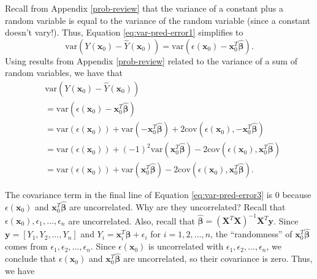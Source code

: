 \documentclass[
]{book}
\theoremstyle{definition}
\theoremstyle{definition}
\theoremstyle{definition}
\theoremstyle{definition}
\theoremstyle{remark}
\begin{document}
Recall from Appendix \ref{prob-review} that the variance of a constant plus a random variable is equal to the variance of the random variable (since a constant doesn't vary!). Thus, Equation \eqref{eq:var-pred-error1} simplifies to
\[
\mathrm{var}\left(Y(\mathbf{x}_0)-\hat{Y}(\mathbf{x}_0)\right) = \mathrm{var}(\epsilon(\mathbf{x}_0)-\mathbf{x}_0^T \hat{\boldsymbol{\beta}}). \label{eq:var-pred-error2}
\]
Using results from Appendix \ref{prob-review} related to the variance of a sum of random variables, we have that
\[
\begin{aligned}
&\mathrm{var}\left(Y(\mathbf{x}_0)-\hat{Y}(\mathbf{x}_0)\right) \\
&= \mathrm{var}(\epsilon(\mathbf{x}_0)-\mathbf{x}_0^T \hat{\boldsymbol{\beta}}) \\ 
&= \mathrm{var}\left(\epsilon(\mathbf{x}_0)\right)+\mathrm{var}(-\mathbf{x}_0^T \hat{\boldsymbol{\beta}}) + 2\mathrm{cov}\left(\epsilon(\mathbf{x}_0), -\mathbf{x}_0^T \hat{\boldsymbol{\beta}}\right) \\
&= \mathrm{var}\left(\epsilon(\mathbf{x}_0)\right)+(-1)^2\mathrm{var}(\mathbf{x}_0^T \hat{\boldsymbol{\beta}}) - 2\mathrm{cov}\left(\epsilon(\mathbf{x}_0), \mathbf{x}_0^T \hat{\boldsymbol{\beta}}\right) \\
&= \mathrm{var}\left(\epsilon(\mathbf{x}_0)\right)+\mathrm{var}(\mathbf{x}_0^T \hat{\boldsymbol{\beta}}) - 2\mathrm{cov}\left(\epsilon(\mathbf{x}_0), \mathbf{x}_0^T \hat{\boldsymbol{\beta}}\right).
\end{aligned}
\label{eq:var-pred-error3}
\]

The covariance term in the final line of Equation \eqref{eq:var-pred-error3} is 0 because \(\epsilon(\mathbf{x}_0)\) and \(\mathbf{x}_0^T\hat{\boldsymbol{\beta}}\) are uncorrelated. Why are they uncorrelated? Recall that \(\epsilon(\mathbf{x}_0), \epsilon_1, \ldots, \epsilon_n\) are uncorrelated. Also, recall that \(\hat{\boldsymbol{\beta}}=(\mathbf{X}^T\mathbf{X})^{-1}\mathbf{X}^T\mathbf{y}\). Since \(\mathbf{y}=[Y_1,Y_2,\ldots,Y_n]\) and \(Y_i=\mathbf{x}_i^T\boldsymbol{\beta} + \epsilon_i\) for \(i=1,2,\ldots,n\), the ``randomness'' of \(\mathbf{x}_0^T\hat{\boldsymbol{\beta}}\) comes from \(\epsilon_1, \epsilon_2, \ldots, \epsilon_n\). Since \(\epsilon(\mathbf{x}_0)\) is uncorrelated with \(\epsilon_1, \epsilon_2, \ldots, \epsilon_n\), we conclude that \(\epsilon(\mathbf{x}_0)\) and \(\mathbf{x}_0^T\hat{\boldsymbol{\beta}}\) are uncorrelated, so their covariance is zero. Thus, we have
\end{document}
